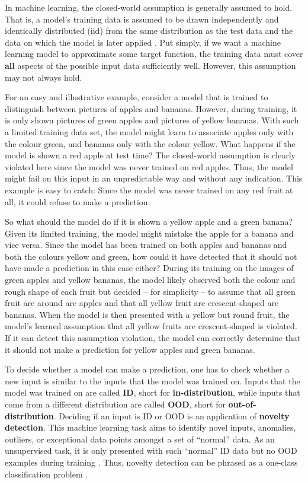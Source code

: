 In machine learning, the closed-world assumption is generally assumed to hold. That is, a model's training data is assumed to be drawn independently and identically distributed (iid) from the same distribution as the test data and the data on which the model is later applied \cite{ood-boundary-2021}. Put simply, if we want a machine learning model to approximate some target function, the training data must cover \textbf{all} aspects of the possible input data sufficiently well. However, this assumption may not always hold.

\newpar For an easy and illustrative example, consider a model that is trained to distinguish between pictures of apples and bananas. However, during training, it is only shown pictures of green apples and pictures of yellow bananas. With such a limited training data set, the model might learn to associate apples only with the colour green, and bananas only with the colour yellow. What happens if the model is shown a red apple at test time? The closed-world assumption is clearly violated here since the model was never trained on red apples. Thus, the model might fail on this input in an unpredictable way and without any indication. This example is easy to catch: Since the model was never trained on any red fruit at all, it could refuse to make a prediction.

So what should the model do if it is shown a yellow apple and a green banana? Given its limited training, the model might mistake the apple for a banana and vice versa. Since the model has been trained on both apples and bananas and both the colours yellow and green, how could it have detected that it should not have made a prediction in this case either? During its training on the images of green apples and yellow bananas, the model likely observed both the colour and rough shape of each fruit but decided -- for simplicity -- to assume that all green fruit are around are apples and that all yellow fruit are crescent-shaped are bananas. When the model is then presented with a yellow but round fruit, the model's learned assumption that all yellow fruits are crescent-shaped is violated. If it can detect this assumption violation, the model can correctly determine that it should not make a prediction for yellow apples and green bananas.

\newpar To decide whether a model can make a prediction, one has to check whether a new input is similar to the inputs that the model was trained on. Inputs that the model was trained on are called \textbf{ID}, short for \textbf{in-distribution}, while inputs that come from a different distribution are called \textbf{OOD}, short for \textbf{out-of-distribution}. Deciding if an input is ID or OOD is an application of \textbf{novelty detection}. This machine learning task aims to identify novel inputs, anomalies, outliers, or exceptional data points amongst a set of ``normal'' data. As an unsupervised task, it is only presented with such ``normal'' ID data but no OOD examples during training \cite{novelty-detection-2010}. Thus, novelty detection can be phrased as a one-class classification problem \cite[e.g.][]{ood-svm-1999}.

